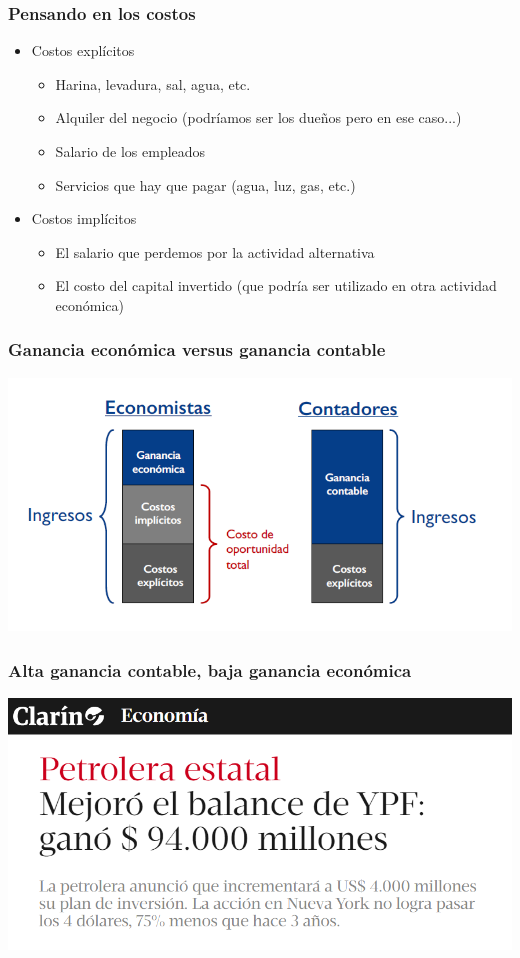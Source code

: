 \documentclass{beamer}
\begin{document}
\begin{frame}
\frametitle{Pensando en los costos}
\begin{itemize}
    \item Costos explícitos
    \begin{itemize}
        \item Harina, levadura, sal, agua, etc.
        \item Alquiler del negocio (podríamos ser los dueños pero en ese caso...)
        \item Salario de los empleados 
        \item Servicios que hay que pagar (agua, luz, gas, etc.)
    \end{itemize}
    \item Costos implícitos
    \begin{itemize}
        \item El salario que perdemos por la actividad alternativa
        \item El costo del capital invertido (que podría ser utilizado en otra actividad económica)
    \end{itemize}
\end{itemize}
\end{frame}

\begin{frame}
\frametitle{Ganancia económica versus ganancia contable}
\centering
\includegraphics[scale=0.6]{Slides Principios de Economia/Figures/Tema_06.13_beneficioeconomicovscontable.png}
\end{frame}

\begin{frame}
\frametitle{Alta ganancia contable, baja ganancia económica}
\centering
\includegraphics[scale=0.6]{Slides Principios de Economia/YPF.png}
\end{frame}
\end{document}
